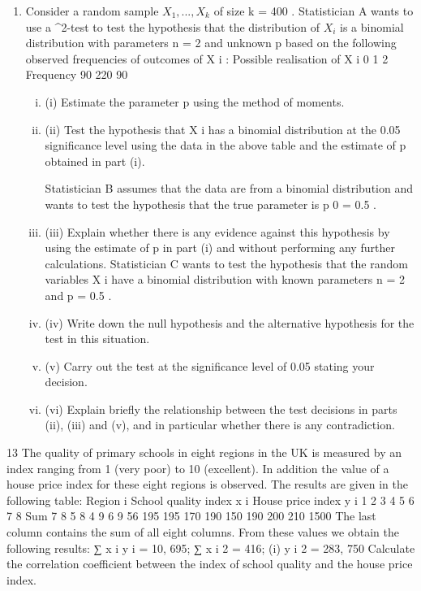 \documentclass[a4paper,12pt]{article}
\begin{document}
\begin{enumerate}

\item Consider a random sample $X_1 , ... , X_k$ of size k = 400 . Statistician A wants to use a
\chi^2-test to test the hypothesis that the distribution of $X_i$ is a binomial distribution
with parameters n = 2 and unknown p based on the following observed frequencies
of outcomes of X i :
Possible realisation of X i 0 1 2
Frequency 90 220 90
\begin{enumerate}[(i)]
\item (i) Estimate the parameter p using the method of moments.
\item (ii) Test the hypothesis that X i has a binomial distribution at the 0.05 significance
level using the data in the above table and the estimate of p obtained in
part (i).

Statistician B assumes that the data are from a binomial distribution and wants to test
the hypothesis that the true parameter is p 0 = 0.5 .
\item (iii)
Explain whether there is any evidence against this hypothesis by using the
estimate of p in part (i) and without performing any further calculations. 
Statistician C wants to test the hypothesis that the random variables X i have a
binomial distribution with known parameters n = 2 and p = 0.5 .
\item (iv) Write down the null hypothesis and the alternative hypothesis for the test in
this situation.

\item (v) Carry out the test at the significance level of 0.05 stating your decision.
\item (vi) Explain briefly the relationship between the test decisions in parts (ii), (iii) and
(v), and in particular whether there is any contradiction.
\end{enumerate}
\end{enumerate}


\newpage

13
The quality of primary schools in eight regions in the UK is measured by an index
ranging from 1 (very poor) to 10 (excellent). In addition the value of a house price
index for these eight regions is observed. The results are given in the following table:
Region i
School quality index x i
House price index y i
1
2
3
4
5
6
7
8
Sum
7
8
5
8
4
9
6
9
56
195 195 170 190 150 190 200 210 1500
The last column contains the sum of all eight columns.
From these values we obtain the following results:
∑ x i y i = 10, 695; ∑ x i 2 = 416;
(i)
\sum y i 2 = 283, 750
Calculate the correlation coefficient between the index of school quality and
the house price index.
\end{document}
